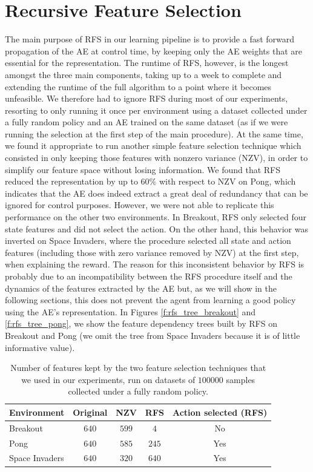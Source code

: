 \section{Recursive Feature Selection}
The main purpose of RFS in our learning pipeline is to provide a fast forward 
propagation of the AE at control time, by keeping only the AE weights that are 
essential for the representation. 
The runtime of RFS, however, is the longest amongst the three main components, 
taking up to a week to complete and extending the runtime of the full algorithm
to a point where it becomes unfeasible. We therefore had to ignore RFS 
during most of our experiments, resorting to only running it once per 
environment using a dataset collected under a fully random policy and an AE 
trained on the same dataset (as if we were running the selection at the first 
step of the main procedure). 
At the same time, we found it appropriate to run another simple feature 
selection technique which consisted in only keeping those features with nonzero 
variance (NZV), in order to simplify our feature space without losing 
information. 
We found that RFS reduced the representation by up to $60\%$ with respect to NZV
on Pong, which indicates that the AE does indeed extract a great deal of 
redundancy that can be ignored for control purposes. 
However, we were not able to replicate this performance on the other two 
environments.
In Breakout, RFS only selected four state features and did not select the action. 
On the other hand, this behavior was inverted on Space Invaders, where the 
procedure selected all state and action features (including those with zero 
variance removed by NZV) at the first step, when explaining the reward. 
The reason for this inconsistent behavior by RFS is probably due to an 
incompatibility between the RFS procedure itself and the dynamics of the 
features extracted by the AE but, as we will show in the following sections,
this does not prevent the agent from learning a good policy using the 
AE's representation.
In Figures \ref{f:rfs_tree_breakout} and \ref{f:rfs_tree_pong}, we show the 
feature dependency trees built by RFS on Breakout and Pong (we omit the tree
from Space Invaders because it is of little informative value).
%
\begin{table}
    \centering
    \begin{tabular}{l c c c c} 
	\hline
	Environment    & Original & NZV   & RFS   & Action selected (RFS) \\ 
	\hline 
	Breakout       & $640$    & $599$ & $4$   & No                    \\
	Pong           & $640$    & $585$ & $245$ & Yes                   \\
	Space Invaders & $640$    & $320$ & $640$ & Yes                   \\
	\hline
    \end{tabular}
    \caption[Feature selection results]{Number of features kept by the two 
	     feature selection techniques that we used in our experiments, run 
	     on datasets of $100000$ samples collected under a fully random 
	     policy.}
    \label{t:RFS_results}
\end{table}
